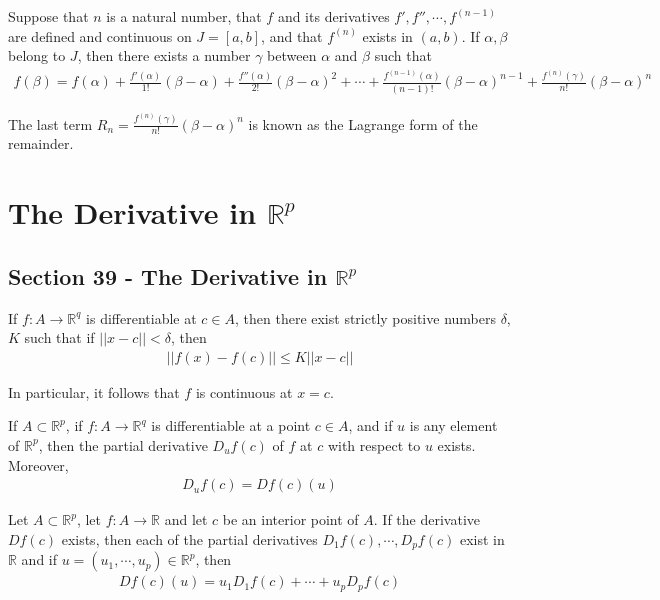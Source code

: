 \documentclass[12pt]{article}
\newcommand{\R}{\mathbb{R}}
\newenvironment{theorem}[2][Theorem]{\begin{trivlist}
\item[\hskip \labelsep {\bfseries #1}\hskip \labelsep {\bfseries #2.}]}{\end{trivlist}}
\newenvironment{lemma}[2][Lemma]{\begin{trivlist}
\item[\hskip \labelsep {\bfseries #1}\hskip \labelsep {\bfseries #2.}]}{\end{trivlist}}
\newenvironment{corollary}[2][Corollary]{\begin{trivlist}
\item[\hskip \labelsep {\bfseries #1}\hskip \labelsep {\bfseries #2.}]}{\end{trivlist}}
\begin{document}
\begin{theorem}[Taylor's]{Theorem}
Suppose that $n$ is a natural number, that $f$ and its derivatives $f', f'', \cdots, f^{(n-1)}$ are defined and continuous on $J = [a, b]$, and that $f^{(n)}$ exists in $(a, b)$. If $\alpha, \beta$ belong to $J$, then there exists a number $\gamma$ between $\alpha$ and $\beta$ such that
\begin{align*}
f(\beta) = f(\alpha) + \frac{f'(\alpha)}{1!}(\beta - \alpha) + \frac{f''(\alpha)}{2!}(\beta - \alpha)^2 + \cdots + \frac{f^{(n-1)}(\alpha)}{(n-1)!}(\beta - \alpha)^{n-1} + \frac{f^{(n)}(\gamma)}{n!}(\beta - \alpha)^n
\end{align*}

The last term $R_n = \frac{f^{(n)}(\gamma)}{n!}(\beta - \alpha)^n$ is known as the Lagrange form of the remainder.
\end{theorem}
\newpage
\section{The Derivative in $\R^p$}

\subsection*{Section 39 - The Derivative in $\mathbb{R}^p$}

\begin{lemma}{39.5}
If $f: A \to \R^q$ is differentiable at $c \in A$, then there exist strictly positive numbers $\delta$, $K$ such that if $||x - c|| < \delta$, then
\begin{align*}
||f(x) - f(c)|| \leq K ||x-c||
\end{align*}

In particular, it follows that $f$ is continuous at $x = c$.
\end{lemma}

\begin{theorem}{39.6}
If $A \subset \R^p$, if $f: A \to \R^q$ is differentiable at a point $c \in A$, and if $u$ is any element of $\R^p$, then the partial derivative $D_uf(c)$ of $f$ at $c$ with respect to $u$ exists. Moreover,
\begin{align*}
D_uf(c) = Df(c)(u)
\end{align*}
\end{theorem}

\begin{corollary}{39.7}
Let $A \subset \R^p$, let $f: A \to \R$ and let $c$ be an interior point of $A$. If the derivative $Df(c)$ exists, then each of the partial derivatives $D_1f(c), \cdots, D_pf(c)$ exist in $\R$ and if $u = (u_1, \cdots, u_p) \in \R^p$, then
\begin{align*}
Df(c)(u) = u_1D_1f(c) + \cdots + u_pD_pf(c)
\end{align*}
\end{corollary}
\end{document}
